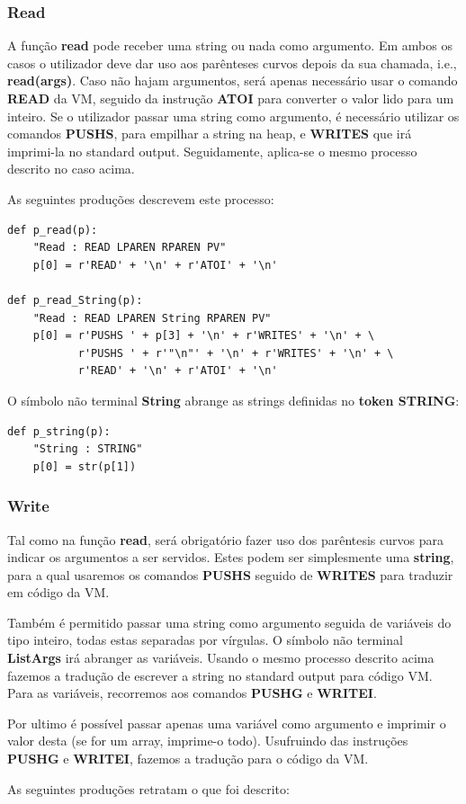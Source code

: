 \documentclass{article}
\begin{document}

\subsubsection {Read}
\setlength{\parindent}{5ex}
A função \textbf{read} pode receber uma string ou nada como argumento. Em ambos os casos o utilizador deve dar uso aos parênteses curvos depois da sua chamada, i.e., \textbf{read(args)}. Caso não hajam argumentos, será apenas necessário usar o comando \textbf{READ} da VM, seguido da instrução \textbf{ATOI} para converter o valor lido para um inteiro. Se o utilizador passar uma string como argumento, é necessário utilizar os comandos \textbf{PUSHS}, para empilhar a string na heap, e \textbf{WRITES} que irá imprimi-la no standard output. Seguidamente, aplica-se o mesmo processo descrito no caso acima.
\par As seguintes produções descrevem este processo:

\begin{lstlisting}[firstnumber=291]
def p_read(p):
    "Read : READ LPAREN RPAREN PV"
    p[0] = r'READ' + '\n' + r'ATOI' + '\n'

def p_read_String(p):
    "Read : READ LPAREN String RPAREN PV"
    p[0] = r'PUSHS ' + p[3] + '\n' + r'WRITES' + '\n' + \
           r'PUSHS ' + r'"\n"' + '\n' + r'WRITES' + '\n' + \
           r'READ' + '\n' + r'ATOI' + '\n'
\end{lstlisting}
O símbolo não terminal \textbf{String} abrange as strings definidas no \textbf{token STRING}:

\begin{lstlisting}[firstnumber=356]
def p_string(p):
    "String : STRING"
    p[0] = str(p[1])
\end{lstlisting}


\subsubsection {Write}
\setlength{\parindent}{5ex} Tal como na função \textbf{read}, será obrigatório fazer uso dos parêntesis curvos para indicar os argumentos a ser servidos. Estes podem ser simplesmente uma \textbf{string}, para a qual usaremos os comandos \textbf{PUSHS} seguido de \textbf{WRITES} para traduzir em código da VM.
\par Também é permitido passar uma string como argumento seguida de variáveis do tipo inteiro, todas estas separadas por vírgulas. O símbolo não terminal \textbf{ListArgs} irá abranger as variáveis. Usando o mesmo processo descrito acima fazemos a tradução de escrever a string no standard output para código VM. Para as variáveis, recorremos aos comandos \textbf{PUSHG} e \textbf{WRITEI}.
\par Por ultimo é possível passar apenas uma variável como argumento e imprimir o valor desta (se for um array, imprime-o todo). Usufruindo das instruções \textbf{PUSHG} e \textbf{WRITEI}, fazemos a tradução para o código da VM.
\par As seguintes produções retratam o que foi descrito:
\end{document}
